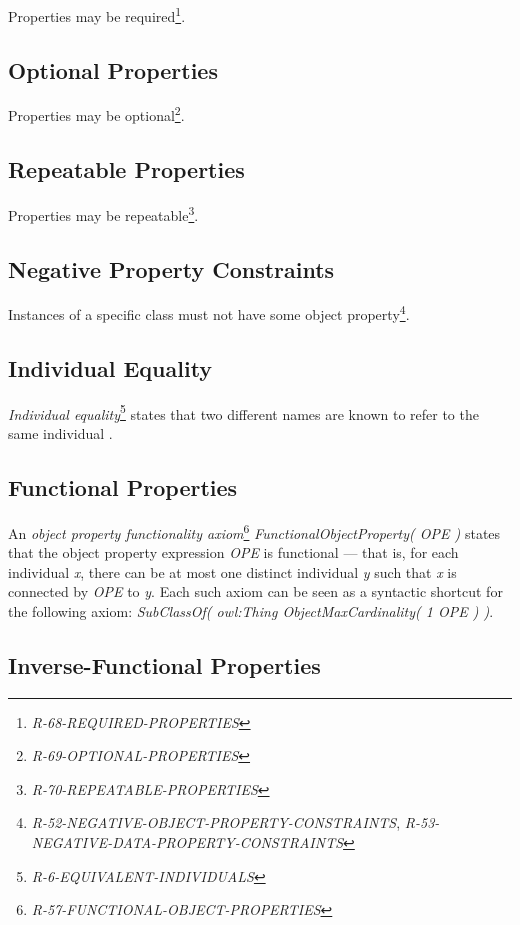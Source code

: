 \documentclass{llncs}
\begin{document}
Properties may be required\footnote{\emph{R-68-REQUIRED-PROPERTIES}}.

\subsection{Optional Properties}

Properties may be optional\footnote{\emph{R-69-OPTIONAL-PROPERTIES}}.

\subsection{Repeatable Properties}

Properties may be repeatable\footnote{\emph{R-70-REPEATABLE-PROPERTIES}}.

\subsection{Negative Property Constraints}

Instances of a specific class must not have some object property\footnote{\emph{R-52-NEGATIVE-OBJECT-PROPERTY-CONSTRAINTS}, \emph{R-53-NEGATIVE-DATA-PROPERTY-CONSTRAINTS}}.

\subsection{Individual Equality}

\emph{Individual equality}\footnote{\emph{R-6-EQUIVALENT-INDIVIDUALS}} states that two different names are known to refer to the same individual \cite{Kroetzsch2012}.

\subsection{Functional Properties}

An \emph{object property functionality axiom}\footnote{\emph{R-57-FUNCTIONAL-OBJECT-PROPERTIES}} \emph{FunctionalObjectProperty( OPE )} states that the object property expression \emph{OPE} is functional — that is, for each individual \emph{x}, there can be at most one distinct individual \emph{y} such that \emph{x} is connected by \emph{OPE} to \emph{y}. Each such axiom can be seen as a syntactic shortcut for the following axiom: \emph{SubClassOf( owl:Thing ObjectMaxCardinality( 1 OPE ) )}.

\subsection{Inverse-Functional Properties}
\end{document}
